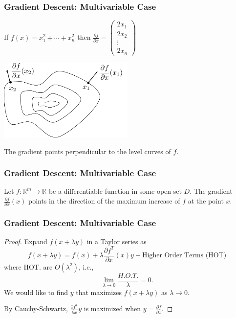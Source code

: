 \documentclass{beamer}
\begin{document}
\begin{frame}\frametitle{Gradient Descent: Multivariable Case}
	\begin{example}
		If $f(x) = x_1^2 + \cdots + x_n^2$ then
		\( 
			\frac{\partial  f}{\partial  x} 
				= \begin{pmatrix}
		    		2x_1\\
		    		2x_2\\
		    		\vdots\\
		    		2x_n
		  		  \end{pmatrix}
		\)		
	\end{example}

	\begin{center}
		\includegraphics[width=0.5\textwidth]
			{figures/chap14_2D_gradiant}
	\end{center}
	The gradient points perpendicular to the level curves of $f$.	
\end{frame}

\begin{frame}\frametitle{Gradient Descent: Multivariable Case}
	\begin{theorem}
		Let $f:\mathbb{R}^m \to \mathbb{R}$ be a differentiable function in some open set $D$.  The gradient $\frac{\partial  f}{\partial  x}(x)$ points in the direction of the maximum increase of $f$ at the point $x$.		
	\end{theorem}
\end{frame}

\begin{frame}\frametitle{Gradient Descent: Multivariable Case}
	\begin{proof}
		Expand $f(x+\lambda y)$ in a Taylor series as
		\[ 
			f(x + \lambda y) = f(x) + \lambda\frac{\partial  f^T}{\partial  x}(x)y + \text{Higher Order Terms (HOT)} 
		\]
		where HOT. are $O(\lambda^2)$, i.e.,
		\[
			\lim_{\lambda \to 0}\frac{H.O.T.}{\lambda} = 0.
		\]	
		We would like to find $y$ that maximizes $f(x + \lambda y)$ as $\lambda \to 0$.

		By Cauchy-Schwartz, $\frac{\partial  f^T}{\partial  x}y$ is maximized when $y = \frac{\partial  f}{\partial  x}$.	
	\end{proof}
\end{frame}
\end{document}
